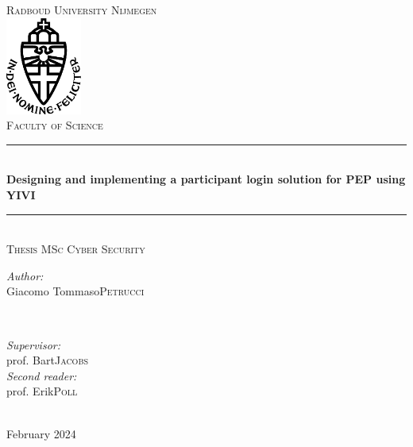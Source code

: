 \documentclass{report}
\title{\thesistitle}
\author{\thesisauthorfirst\space\thesisauthorsecond}
\date{\thesisdate}
\def\thesistitle{Designing and implementing a participant login solution for PEP using YIVI}
\def\thesisauthorfirst{Giacomo Tommaso}
\def\thesisauthorsecond{Petrucci}
\def\thesissupervisorfirst{prof. Bart}
\def\thesissupervisorsecond{Jacobs}
\def\thesissecondreaderfirst{prof. Erik}
\def\thesissecondreadersecond{Poll}
\def\thesisdate{February 2024}
\begin{document}
\begin{titlepage}
	\thispagestyle{empty}
	\newcommand{\HRule}{\rule{\linewidth}{0.5mm}}
	\center
	\textsc{\Large Radboud University Nijmegen}\\[.7cm]
	\includegraphics[width=25mm]{in_dei_nomine_feliciter.eps}\\[.5cm]
	\textsc{Faculty of Science}\\[0.5cm]
	
	\HRule \\[0.4cm]
	{ \huge \bfseries \thesistitle}\\[0.1cm]
	\HRule \\[.5cm]
	\textsc{\large Thesis MSc Cyber Security}\\[.5cm]
	
	\begin{minipage}{0.4\textwidth}
	\begin{flushleft} \large
	\emph{Author:}\\
	\thesisauthorfirst\space \textsc{\thesisauthorsecond}
	\end{flushleft}
	\end{minipage}
	~
	\begin{minipage}{0.4\textwidth}
	\begin{flushright} \large
	\emph{Supervisor:} \\
	\thesissupervisorfirst\space \textsc{\thesissupervisorsecond} \\[1em]
	\emph{Second reader:} \\
	\thesissecondreaderfirst\space \textsc{\thesissecondreadersecond}
	\end{flushright}
	\end{minipage}\\[4cm]
	\vfill
	{\large \thesisdate}\\
	\clearpage
\end{titlepage}

\begin{abstract}
	Polymorphic Encryption and Pseudonimisation (PEP) is both a technology and a project developed at iHub to let researcher collect medical data of people taking part in studies, 
	while preserving their privacy. To do so, it uses ElGamal cipher's properties that allow to re-key and re-shuffle encrypted data and participant identifiers called local 
	pseudonyms. While this system effectively safeguards a participant's privacy, it also makes it non-trivial to design a way for the participants to access their own data: due to 
	PEP's privacy goals, the typical login with email and password is out of the question. This thesis presents a conceptual design for a login system for study participants that
	is in line with PEP's data protection goals and a proof of concept implementation of such system. 
\end{abstract}
\end{document}
